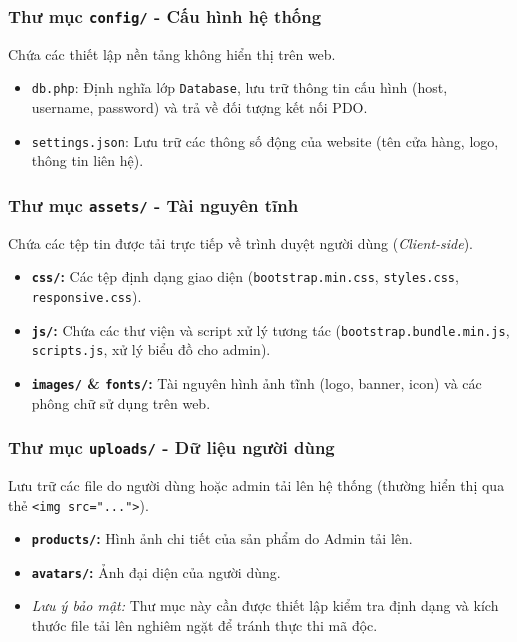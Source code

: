 \subsubsection{Thư mục \texttt{config/} - Cấu hình hệ thống}
Chứa các thiết lập nền tảng không hiển thị trên web.
\begin{itemize}
    \item \texttt{db.php}: Định nghĩa lớp \texttt{Database}, lưu trữ thông tin cấu hình (host, username, password) và trả về đối tượng kết nối PDO.
    \item \texttt{settings.json}: Lưu trữ các thông số động của website (tên cửa hàng, logo, thông tin liên hệ).
\end{itemize}

\subsubsection{Thư mục \texttt{assets/} - Tài nguyên tĩnh}
Chứa các tệp tin được tải trực tiếp về trình duyệt người dùng (\textit{Client-side}).
\begin{itemize}
    \item \textbf{\texttt{css/}:} Các tệp định dạng giao diện (\texttt{bootstrap.min.css}, \texttt{styles.css}, \texttt{responsive.css}).
    \item \textbf{\texttt{js/}:} Chứa các thư viện và script xử lý tương tác (\texttt{bootstrap.bundle.min.js}, \texttt{scripts.js}, xử lý biểu đồ cho admin).
    \item \textbf{\texttt{images/} \& \texttt{fonts/}:} Tài nguyên hình ảnh tĩnh (logo, banner, icon) và các phông chữ sử dụng trên web.
\end{itemize}

\subsubsection{Thư mục \texttt{uploads/} - Dữ liệu người dùng}
Lưu trữ các file do người dùng hoặc admin tải lên hệ thống (thường hiển thị qua thẻ \texttt{<img src="...">}).
\begin{itemize}
    \item \textbf{\texttt{products/}:} Hình ảnh chi tiết của sản phẩm do Admin tải lên.
    \item \textbf{\texttt{avatars/}:} Ảnh đại diện của người dùng.
    \item \textit{Lưu ý bảo mật:} Thư mục này cần được thiết lập kiểm tra định dạng và kích thước file tải lên nghiêm ngặt để tránh thực thi mã độc.
\end{itemize}

